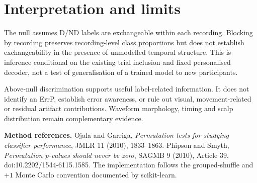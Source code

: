 \documentclass[11pt,a4paper]{article}
\begin{document}
\section{Interpretation and limits}
The null assumes D/ND labels are exchangeable within each recording. Blocking by recording preserves recording-level class proportions but does not establish exchangeability in the presence of unmodelled temporal structure. This is inference conditional on the existing trial inclusion and fixed personalised decoder, not a test of generalisation of a trained model to new participants.

Above-null discrimination supports useful label-related information. It does not identify an ErrP, establish error awareness, or rule out visual, movement-related or residual artifact contributions. Waveform morphology, timing and scalp distribution remain complementary evidence.

\small\textbf{Method references.} Ojala and Garriga, \emph{Permutation tests for studying classifier performance}, JMLR 11 (2010), 1833--1863. Phipson and Smyth, \emph{Permutation p-values should never be zero}, SAGMB 9 (2010), Article 39, doi:10.2202/1544-6115.1585. The implementation follows the grouped-shuffle and $+1$ Monte Carlo convention documented by scikit-learn.
\end{document}
